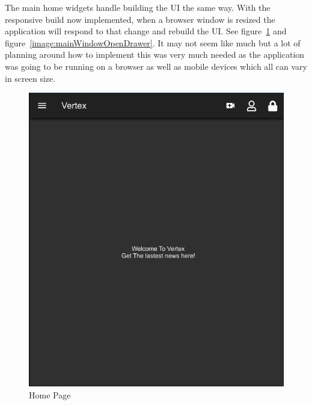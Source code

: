 The main home widgets handle building the UI the same way. With the responsive build now implemented, when a browser window is resized the application will respond to that change and rebuild the UI. See figure~\ref{image:mainWindow} and figure~\ref{image:mainWindowOpenDrawer}. It may not seem like much but a lot of planning around how to implement this was very much needed as the application was going to be running on a browser as well as mobile devices which all can vary in screen size.

\begin{figure}[h!]
    \caption{Home Page}
    \label{image:mainWindow}
    \centering
    \includegraphics[width=1.0\textwidth]{images/resized_window_main.png}
\end{figure}

